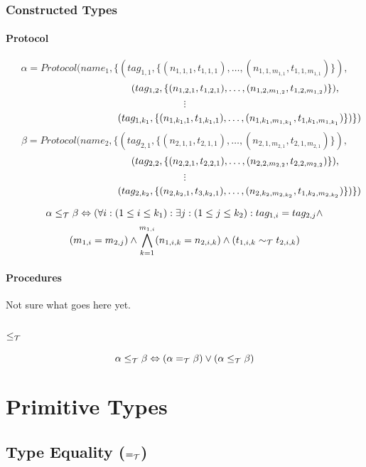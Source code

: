 \documentclass[]{article}
\begin{document}
\subsubsection{Constructed Types}

\paragraph{Protocol}

\[
\alpha = Protocol(name_1,\{(tag_{1,1},\{(n_{1,1,1},t_{1,1,1}),\ldots,(n_{1,1,m_{1,1}},t_{1,1,m_{1,1}})\}),
\]
\[
\hspace*{3.6cm}(tag_{1,2},\{(n_{1,2,1},t_{1,2,1}),\ldots,(n_{1,2,m_{1,2}},t_{1,2,m_{1,2}})\}),
\]
\[
\vdots
\]
\[
\hspace*{3.9cm}(tag_{1,k_1},\{(n_{1,k_1,1},t_{1,k_1,1}),\ldots,(n_{1,k_1,m_{1,k_1}},t_{1,k_1,m_{1,k_1}})\})\})
\]
\[
\beta = Protocol(name_2,\{(tag_{2,1},\{(n_{2,1,1},t_{2,1,1}),\ldots,(n_{2,1,m_{2,1}},t_{2,1,m_{2,1}})\}),
\]
\[
\hspace*{3.6cm}(tag_{2,2},\{(n_{2,2,1},t_{2,2,1}),\ldots,(n_{2,2,m_{2,2}},t_{2,2,m_{2,2}})\}),
\]
\[
\vdots
\]
\[
\hspace*{3.9cm}(tag_{2,k_2},\{(n_{2,k_2,1},t_{3,k_2,1}),\ldots,(n_{2,k_2,m_{2,k_2}},t_{1,k_2,m_{2,k_2}})\})\})
\]

\[
\alpha \leq_{\cal T} \beta \Leftrightarrow (\forall i: (1 \leq i \leq k_1): \exists j: (1 \leq j \leq k_2): tag_{1,i} = tag_{2,j} \wedge 
\]
\[
(m_{1,i} = m_{2,j}) \wedge \bigwedge^{m_{1,i}}_{k=1}(n_{1,i,k} = n_{2,i,k}) \wedge (t_{1,i,k} \sim_{\cal T} t_{2,i,k})
\]

\paragraph{Procedures}

Not sure what goes here yet.


\subsection{$\leq_{\cal T}$}

\[
\alpha \leq_{\cal T} \beta \Leftrightarrow (\alpha =_{\cal T} \beta) \vee (\alpha \leq_{\cal T} \beta)
\]

\section{Primitive Types}

\subsection{Type Equality ($=_{\cal T}$)}
\end{document}
